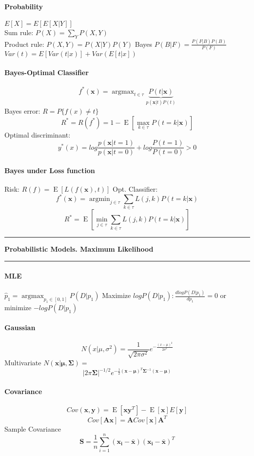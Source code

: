 \documentclass[7pt]{scrartcl}
\newlength{\secskip}
\renewcommand{\section}[1]{
  \vspace{\secskip}
  \hrule\vspace{.3em}
  \textbf{#1}
  \vspace{.3em}
  \hrule
  \vspace{\secskip}
}
\DeclareMathOperator*{\argmax}{argmax}
\DeclareMathOperator*{\argmin}{argmin}
\DeclareMathOperator{\E}{E}
\renewcommand{\vec}{\mathbf}
\begin{document}
\begin{multicols}{4}
\paragraph{Probability}
$E[X] = E[E[X|Y]]$ \\
Sum rule: $P(X) = \sum_Y P(X,Y)$\\
Product rule: $P(X,Y) = P(X|Y)P(Y)$
Bayes $P(B|F) = \frac{P(F|B)P(B)}{P(F)}$ \\
$Var(t) = E[Var(t|x)] + Var(E[t|x])$
\paragraph{Bayes-Optimal Classifier}
\[f^*(\vec x) = \argmax_{t \in \tau} \underbrace{P(t|\vec x)}_{p(\vec x|t) P(t)}\]
Bayes error: $R = P\{f(x) \neq t\}$
\[ R^* = R(f^*) = 1 - \E \left [ \max_{k\in\tau} P(t = k | \vec x) \right ] \]
Optimal discriminant:
\[y^*(x) = log \frac{p(\vec{x}|t=1)}{p(\vec{x}|t=0)} + log \frac{P(t=1)}{P(t=0)} > 0\]
\paragraph{Bayes under Loss function}
Risk: $ R(f) = \E \left [ L(f(\vec x), t) \right ]$
Opt. Classifier:
\[f^*(\vec x) = \argmin_{j \in \tau} \sum_{k \in \tau} L(j,k) P(t = k | \vec x) \]
\[ R^* = \E \left [ \min_{j\in\tau} \sum_{k \in \tau} L(j,k) P(t = k | \vec x) \right ] \]

\section{Probabilistic Models. Maximum Likelihood}
\paragraph{MLE} $\hat{p}_1 = \argmax_{p_1 \in [0,1]}P(D|p_1)$ Maximize $logP(D|p_1) :  \frac{dlogP(D|p_1)}{dp_1} = 0$ or minimize $-logP(D|p_1)$
\paragraph{Gaussian}
\[N(x|\mu,\sigma^2) = \frac{1}{\sqrt{2\pi\sigma^2}} e^{-\frac{(x-\mu)^2}{2\sigma^2}}\]
Multivariate $N(\vec{x}|\vec{\mu},\vec{\Sigma}) =$
\[|2\pi\vec{\Sigma}|^{-1/2} e^{-\frac{1}{2}(\vec{x}-\vec{\mu})^T\vec{\Sigma}^{-1}(\vec{x}-\vec{\mu})}\]
\paragraph{Covariance}
$$Cov(\vec x, \vec y) = \E[\vec x \vec y ^ T] - \E[\vec x]E[\vec y]$$
$$Cov[\vec A \vec x] = \vec A Cov[\vec x] \vec A^T$$
Sample Covariance 
\[\vec{S} = \frac{1}{n} \sum_{i=1}^n (\vec{x_i - \bar{x}})(\vec{x_i - \bar{x}})^T\]

\end{multicols}
\end{document}
